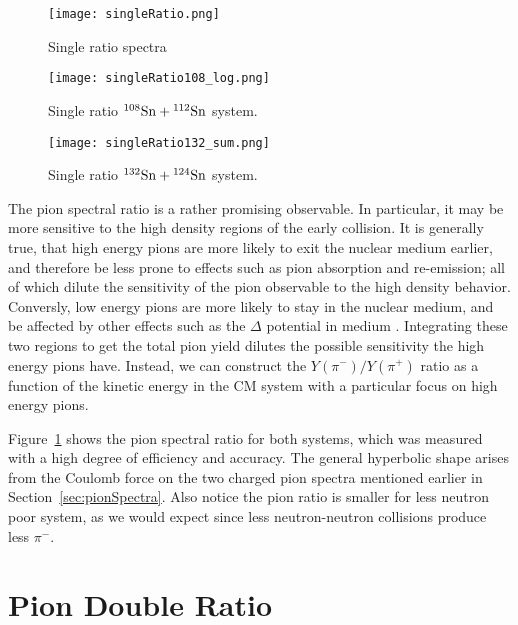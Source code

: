\begin{figure}[!htb]
\centering
\texttt{[image: singleRatio.png]}
\caption{Single ratio spectra}
\label{fig:SRspectra}
\end{figure}



\begin{figure}[!htb]
\centering
\texttt{[image: singleRatio108\_log.png]}
\caption{Single ratio ${}^{108}\mathrm{Sn} + {}^{112}\mathrm{Sn}$ system.}
\label{fig:SRsn108}
\end{figure}

\begin{figure}[!htb]
\centering
\texttt{[image: singleRatio132\_sum.png]}
\caption{Single ratio ${}^{132}\mathrm{Sn} + {}^{124}\mathrm{Sn}$ system.}
\label{fig:SRsn132}
\end{figure}

The pion spectral ratio is a rather promising observable. In particular, it may be more sensitive to the high density regions of the early collision. It is generally true, that high energy pions are more likely to exit the nuclear medium  earlier, and therefore be less prone to effects such as pion absorption and re-emission; all of which dilute the sensitivity of the pion observable to the high density behavior. Conversly, low energy pions are more likely to stay in the nuclear medium, and be affected by other effects such as the $\Delta$ potential in medium \cite{baoan_deltapotential}. Integrating these two regions to get the total pion yield dilutes the possible sensitivity the high energy pions have. Instead, we can construct the $Y(\pi^-)/Y(\pi^+)$ ratio as a function of the kinetic energy in the CM system with a particular focus on high energy pions.


Figure~\ref{fig:SRspectra} shows the pion spectral ratio for both systems, which was measured with a high degree of efficiency and accuracy. The general hyperbolic shape arises from the Coulomb force on the two charged pion spectra mentioned earlier in Section~\ref{sec:pionSpectra}. Also notice the pion ratio is smaller for less neutron poor system, as we would expect since less neutron-neutron collisions produce less $\pi^-$. 




\section{Pion Double Ratio}

